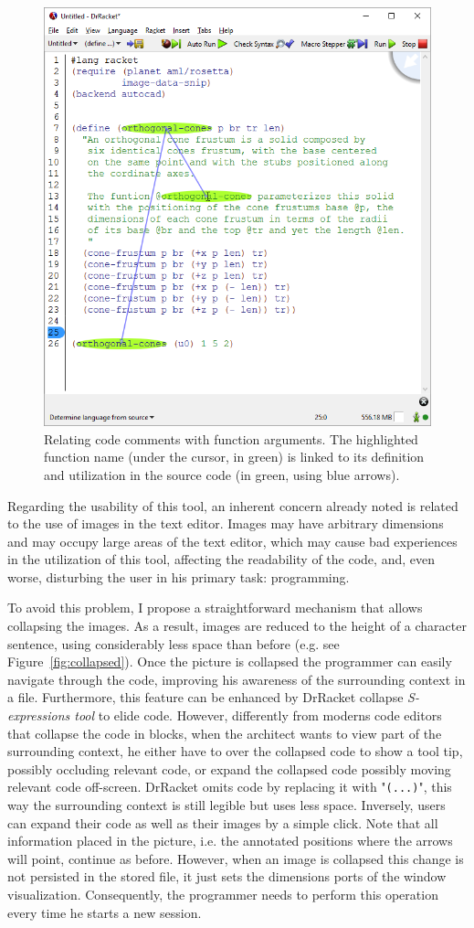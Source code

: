 \begin{figure}[!h]
  \centering
  \includegraphics[width=.4\textwidth]{images/orto-cone-1}
  \caption{Relating code comments with function arguments. The highlighted function name (under the cursor, in green) is linked to its definition and utilization in the source code (in green, using blue arrows).}
  \label{fig:ortocone1}
\end{figure}

Regarding the usability of this tool, an inherent concern already noted is related to the use of images in the text editor. Images may have arbitrary dimensions and may occupy large areas of the text editor, which may cause bad experiences in the utilization of this tool, affecting the readability of the code, and, even worse, disturbing the user in his primary task: programming.

To avoid this problem, I propose a straightforward mechanism that allows collapsing the images. As a result, images are reduced to the height of a character sentence, using considerably less space than before (e.g. see Figure~\ref{fig:collapsed}). Once the picture is collapsed the programmer can easily navigate through the code, improving his awareness of the surrounding context in a file. Furthermore, this feature can be enhanced by DrRacket collapse \textit{S-expressions tool} to elide code. However, differently from moderns code editors that collapse the code in blocks, when the architect wants to view part of the surrounding context, he either have to over the collapsed code to show a tool tip, possibly occluding relevant code, or expand the collapsed code possibly moving relevant code off-screen. DrRacket omits code by replacing it with "\texttt{(...)}", this way the surrounding context is still legible but uses less space. Inversely, users can expand their code as well as their images by a simple click. Note that all information placed in the picture, i.e. the annotated positions where the arrows will point, continue as before. However, when an image is collapsed this change is not persisted in the stored file, it just sets the dimensions ports of the window visualization. Consequently, the programmer needs to perform this operation every time he starts a new session. 

